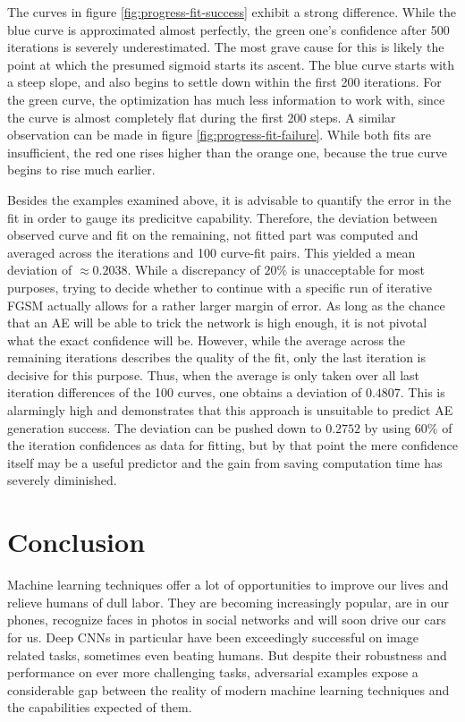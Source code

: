 \documentclass[11pt, a4paper]{article}
\begin{document}
The curves in figure \ref{fig:progress-fit-success} exhibit a strong difference. While the blue curve is approximated almost perfectly, the green one's confidence after 500 iterations is severely underestimated. The most grave cause for this is likely the point at which the presumed sigmoid starts its ascent. The blue curve starts with a steep slope, and also begins to settle down within the first 200 iterations. For the green curve, the optimization has much less information to work with, since the curve is almost completely flat during the first 200 steps. A similar observation can be made in figure \ref{fig:progress-fit-failure}. While both fits are insufficient, the red one rises higher than the orange one, because the true curve begins to rise much earlier.

Besides the examples examined above, it is advisable to quantify the error in the fit in order to gauge its predicitve capability. Therefore, the deviation between observed curve and fit on the remaining, not fitted part was computed and averaged across the iterations and 100 curve-fit pairs. This yielded a mean deviation of $\approx 0.2038$. While a discrepancy of $20\%$ is unacceptable for most purposes, trying to decide whether to continue with a specific run of iterative FGSM actually allows for a rather larger margin of error. As long as the chance that an AE will be able to trick the network is high enough, it is not pivotal what the exact confidence will be. However, while the average across the remaining iterations describes the quality of the fit, only the last iteration is decisive for this purpose. Thus, when the average is only taken over all last iteration differences of the 100 curves, one obtains a deviation of $0.4807$. This is alarmingly high and demonstrates that this approach is unsuitable to predict AE generation success. The deviation can be pushed down to $0.2752$ by using $60\%$ of the iteration confidences as data for fitting, but by that point the mere confidence itself may be a useful predictor and the gain from saving computation time has severely diminished.












\section{Conclusion}
Machine learning techniques offer a lot of opportunities to improve our lives and relieve humans of dull labor. They are becoming increasingly popular, are in our phones, recognize faces in photos in social networks and will soon drive our cars for us. Deep CNNs in particular have been exceedingly successful on image related tasks, sometimes even beating humans. But despite their robustness and performance on ever more challenging tasks, adversarial examples expose a considerable gap between the reality of modern machine learning techniques and the capabilities expected of them.
\end{document}
